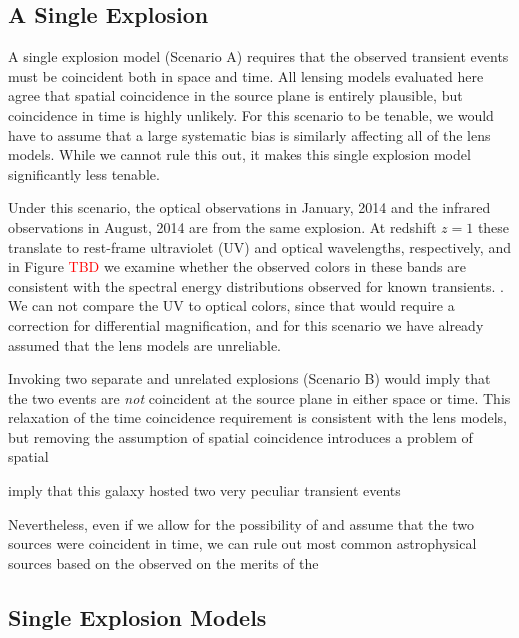 


\subsection{A Single Explosion}

A single explosion model (Scenario A) requires that the observed
transient events must be coincident both in space and time.  All
lensing models evaluated here agree that spatial coincidence in the
source plane is entirely plausible, but coincidence in time is highly
unlikely. For this scenario to be tenable, we would have to assume
that a large systematic bias is similarly affecting all of the lens
models.  While we cannot rule this out, it makes this single explosion
model significantly less tenable. 

Under this scenario, the optical observations in January, 2014 and the
infrared observations in August, 2014 are from the same explosion. At
redshift $z=1$ these translate to rest-frame ultraviolet (UV) and
optical wavelengths, respectively, and in Figure \textcolor{red}{TBD}
we examine whether the observed colors in these bands are consistent
with the spectral energy distributions observed for known transients.
.  We can not
compare the UV to optical colors, since that would require a
correction for differential magnification, and for this scenario we
have already assumed that the lens models are unreliable. 



Invoking two separate and unrelated explosions (Scenario B) would imply that the two events are {\it not} coincident at the source plane in either space or time.  This relaxation of the time coincidence requirement is consistent with the lens models, but removing the assumption of spatial coincidence introduces a problem of spatial 

imply that this galaxy hosted two very peculiar transient events 

Nevertheless, even if we allow for the possibility of and assume that the
two sources were coincident in time, we can rule out most common astrophysical sources based on the observed  on
the merits of the


\subsection{Single Explosion Models}

